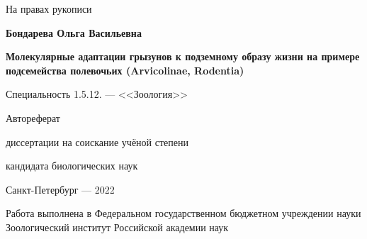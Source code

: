 \def\hrf#1{\hbox to#1{\hrulefill}} %
\newcommand{\sfs}{\fontsize{14pt}{15pt}\selectfont}
\sfs %
\thispagestyle{empty}

\vspace{10mm}
\begin{flushright}
	\Large На правах рукописи 
\end{flushright}

\vspace{30mm}
\begin{center}
{\Large\bf Бондарева Ольга Васильевна}
\end{center}

\vspace{30mm}
\begin{center}
{\bf \LARGE Молекулярные адаптации грызунов к подземному образу жизни на примере подсемейства полевочьих (Arvicolinae, Rodentia)
\par}

\vspace{30mm}
{\Large
Специальность 1.5.12. --- <<Зоология>>
}

\vspace{15mm}
\LARGE Автореферат\par
\Large диссертации на соискание учёной степени\par
кандидата биологических наук
\end{center}

\vspace{40mm}
\begin{center}
{\Large Санкт-Петербург --- 2022}
\end{center}

\newpage
\thispagestyle{empty}
\noindent Работа выполнена в Федеральном государственном бюджетном учреждении науки Зоологический институт Российской академии наук

